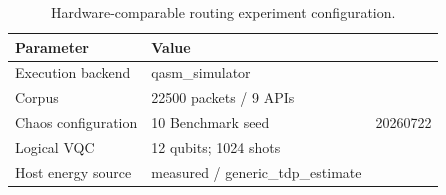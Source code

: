 \begin{table}[htbp]
\caption{Hardware-comparable routing experiment configuration.}
\label{tab:routing-experiment-configuration}
\centering
\begin{tabular}{ll}
\hline
Parameter & Value \\
\hline
Execution backend & qasm\_simulator \\
Corpus & 22500 packets / 9 APIs \\
Chaos configuration & 10%
Benchmark seed & 20260722 \\
Logical VQC & 12 qubits; 1024 shots \\
Host energy source & measured / generic\_tdp\_estimate \\
\hline
\end{tabular}
\end{table}
